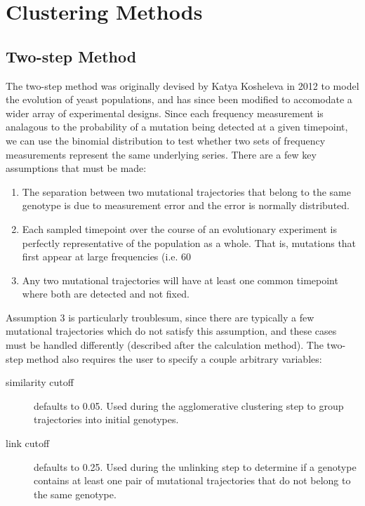 \documentclass{report}
\begin{document}
\chapter{Clustering Methods}

\section{Two-step Method}
The two-step method was originally devised by Katya Kosheleva in 2012 to model the evolution of yeast populations, and has since been modified to accomodate a wider array of experimental designs. Since each frequency measurement is analagous to the probability of a mutation being detected at a given timepoint, we can use the binomial distribution to test whether two sets of frequency measurements represent the same underlying series. There are a few key assumptions that must be made:

\begin{enumerate}
\item The separation between two mutational trajectories that belong to the same genotype is due to measurement error and the error is normally distributed.
\item Each sampled timepoint over the course of an evolutionary experiment is perfectly representative of the population as a whole. That is, mutations that first appear at large frequencies (i.e. 60%
\item Any two mutational trajectories will have at least one common timepoint where both are detected and not fixed.
\end{enumerate}

Assumption 3 is particularly troublesum, since there are typically a few mutational trajectories which do not satisfy this assumption, and these cases must be handled differently (described after the calculation method).
The two-step method also requires the user to specify a couple arbitrary variables:

\begin{description}
\item[similarity cutoff] defaults to 0.05. Used during the agglomerative clustering step to group trajectories into initial genotypes.
\item[link cutoff] defaults to 0.25. Used during the unlinking step to determine if a genotype contains at least one pair of mutational trajectories that do not belong to the same genotype.
\end{description}
\end{document}
